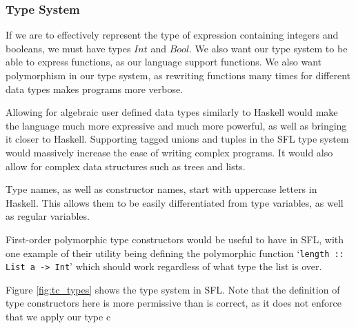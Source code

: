 \subsubsection{Type System}
\label{sec:type_system_design}
If we are to effectively represent the type of expression containing integers and booleans, we must have types $Int$ and $Bool$. We also want our type system to be able to express functions, as our language support functions. We also want polymorphism in our type system, as rewriting functions many times for different data types makes programs more verbose.  

Allowing for algebraic user defined data types similarly to Haskell would make the language much more expressive and much more powerful, as well as bringing it closer to Haskell. Supporting tagged unions and tuples in the \ac{SFL} type system would massively increase the ease of writing complex programs. It would also allow for complex data structures such as trees and lists. 

Type names, as well as constructor names,  start with uppercase letters in Haskell. This allows them to be easily differentiated from type variables, as well as regular variables.

First-order polymorphic type constructors would be useful to have in \ac{SFL}, with one example of their utility being defining the polymorphic function `\verb|length :: List a -> Int|' which should work regardless of what type the list is over. 

Figure \ref{fig:tc_types} shows the type system in SFL. Note that the definition of type constructors here is more permissive than is correct, as it does not enforce that we apply our type c

